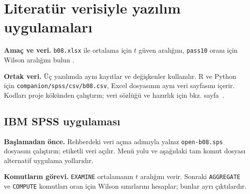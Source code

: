 \section{Literatür verisiyle yazılım uygulamaları}
\label{sec:spss-b08}

\textbf{Amaç ve veri.} \texttt{b08.xlsx} ile ortalama için $t$ güven
aralığını, \texttt{pass10} oranı için Wilson aralığını bulun
\citep{cortez2008data}.

\textbf{Ortak veri.} Üç yazılımda aynı kayıtlar ve değişkenler kullanılır. R ve Python için \texttt{companion/spss/csv/b08.csv}, Excel dosyasının aynı veri sayfasını içerir. Kodları proje kökünden çalıştırın; veri sözlüğü ve hazırlık için bkz. sayfa~\pageref{sec:spss-guide}.

\subsection{IBM SPSS uygulaması}
\textbf{Başlamadan önce.} Rehberdeki veri açma adımıyla yalnız \texttt{open-b08.sps} dosyasını çalıştırın; etiketli veri açılır. Menü yolu ve aşağıdaki tam komut dosyası alternatif uygulama yollarıdır.

\begin{spssadimlar}
\end{spssadimlar}

{\raggedright
\noindent\textbf{Komutların görevi.} \texttt{EXAMINE} ortalamanın $t$ aralığını verir. Sonraki \texttt{AGGREGATE} ve \texttt{COMPUTE} komutları oran için Wilson sınırlarını hesaplar; bunlar ayrı çıktılardır.\par}

